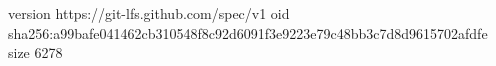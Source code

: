 version https://git-lfs.github.com/spec/v1
oid sha256:a99bafe041462cb310548f8c92d6091f3e9223e79c48bb3c7d8d9615702afdfe
size 6278

